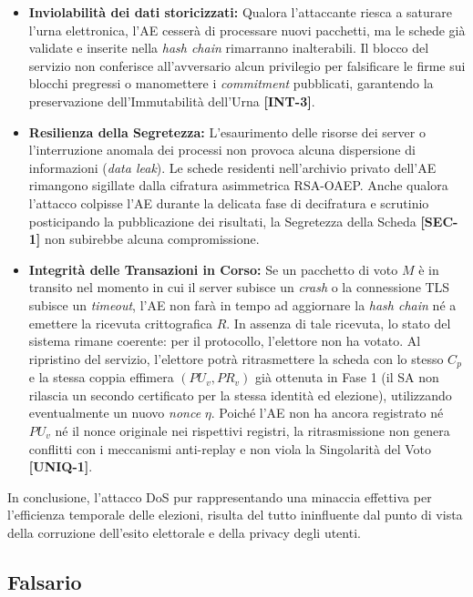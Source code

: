 \begin{itemize}
    \item \textbf{Inviolabilità dei dati storicizzati:} Qualora l'attaccante riesca a saturare l'urna elettronica, l'AE cesserà di processare nuovi pacchetti, ma le schede già validate e inserite nella \textit{hash chain} rimarranno inalterabili. Il blocco del servizio non conferisce all'avversario alcun privilegio per falsificare le firme sui blocchi pregressi o manomettere i \textit{commitment} pubblicati, garantendo la preservazione dell'Immutabilità dell'Urna \textbf{[INT-3]}.
    \item \textbf{Resilienza della Segretezza:} L'esaurimento delle risorse dei server o l'interruzione anomala dei processi non provoca alcuna dispersione di informazioni (\textit{data leak}). Le schede residenti nell'archivio privato dell'AE rimangono sigillate dalla cifratura asimmetrica RSA-OAEP. Anche qualora l'attacco colpisse l'AE durante la delicata fase di decifratura e scrutinio posticipando la pubblicazione dei risultati, la Segretezza della Scheda \textbf{[SEC-1]} non subirebbe alcuna compromissione.
    \item \textbf{Integrità delle Transazioni in Corso:} Se un pacchetto di voto $M$ è in transito nel momento in cui il server subisce un \textit{crash} o la connessione TLS subisce un \textit{timeout}, l'AE non farà in tempo ad aggiornare la \textit{hash chain} né a emettere la ricevuta crittografica $R$. In assenza di tale ricevuta, lo stato del sistema rimane coerente: per il protocollo, l'elettore non ha votato. Al ripristino del servizio, l'elettore potrà ritrasmettere la scheda con lo stesso $C_p$ e la stessa coppia effimera $(PU_v, PR_v)$ già ottenuta in Fase 1 (il SA non rilascia un secondo certificato per la stessa identità ed elezione), utilizzando eventualmente un nuovo \textit{nonce} $\eta$. Poiché l'AE non ha ancora registrato né $PU_v$ né il nonce originale nei rispettivi registri, la ritrasmissione non genera conflitti con i meccanismi anti-replay e non viola la Singolarità del Voto \textbf{[UNIQ-1]}.
\end{itemize}

In conclusione, l'attacco DoS pur rappresentando una minaccia effettiva per l'efficienza temporale delle elezioni, risulta del tutto ininfluente dal punto di vista della corruzione dell'esito elettorale e della privacy degli utenti.

\subsection{Falsario}
\label{subsec:3.2.3_falsario}

